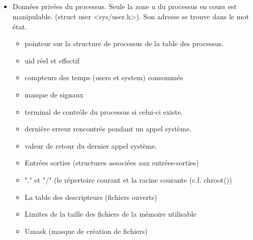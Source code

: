 \subsection{\subsectitle}
\begin{frame}{\sectitle}
\begin{block}{\subsectitle}
\begin{itemize}
\item Données privées du processus. Seule la zone u du processus en cours est
manipulable. (struct user <sys/user.h>). Son adresse se trouve dans le mot état.
\begin{itemize}
\item pointeur sur la structure de processus de la table des processus. 
\item uid réel et effectif
\item compteurs des temps (users et system) consommés
\item masque de signaux
\item terminal de contrôle du processus si celui-ci existe. 
\item dernière erreur rencontrée pendant un appel système. 
\item valeur de retour du dernier appel système. 
\item Entrées sorties (structures associées aux entrées-sorties)
\item "." et "/" (le répertoire courant et la racine courante (c.f. chroot()) 
\item La table des descripteurs (fichiers ouverts)
\item Limites de la taille des fichiers de la mémoire utilisable
\item Umask (masque de création de fichiers)
\end{itemize}
\end{itemize}
\end{block}
\end{frame}





